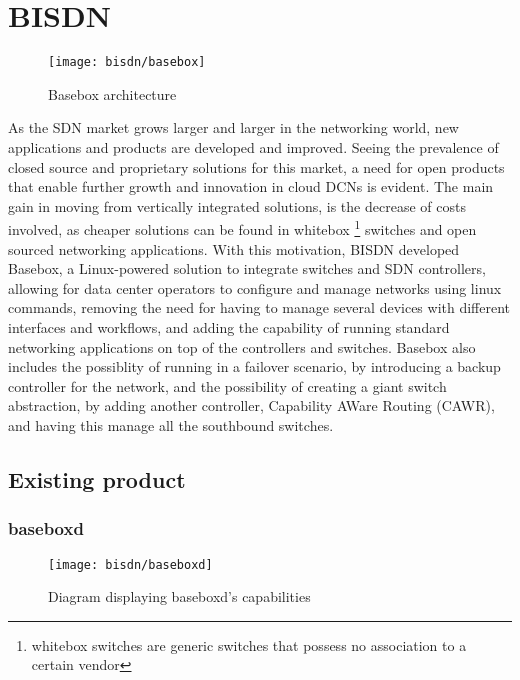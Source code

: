 \section {BISDN} \label{sec:bisdn} %

\begin{figure} [!htbp]
    \centering
    \texttt{[image: bisdn/basebox]}
    \caption{Basebox architecture}
\end{figure}

As the SDN market grows larger and larger in the networking world, new applications and products are developed and improved. Seeing the prevalence of closed source
and proprietary solutions for this market, a need for open products that enable further growth and innovation in cloud DCNs is evident. The main gain in moving from 
vertically integrated solutions, is the decrease of costs involved, as cheaper solutions can be found in whitebox \footnote {whitebox switches are generic switches
that possess no association to a certain vendor} switches and open sourced networking applications. With this motivation, BISDN developed Basebox, a Linux-powered
solution to integrate switches and SDN controllers, allowing for data center  operators to configure and manage networks using linux commands, removing the need for
having to manage several devices with different interfaces and workflows, and adding the capability of running standard networking applications on top of the 
controllers and switches. Basebox also includes the possiblity of running in a failover scenario, by introducing a backup controller for the network, and the
possibility of creating a giant switch abstraction, by adding another controller, Capability AWare Routing (CAWR), and having this manage all the southbound switches.

\subsection {Existing product}

\subsubsection {baseboxd}

\begin{figure} [!htbp]
    \centering
    \texttt{[image: bisdn/baseboxd]}
    \caption{Diagram displaying baseboxd's capabilities\cite{bisdn_gmbh_software_2017}}
\end{figure}


